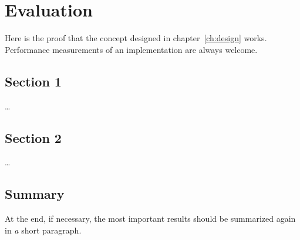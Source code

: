 
\chapter{Evaluation}
\label{ch:evaluation}
Here is the proof that the concept designed in chapter~\ref{ch:design}
works. 
Performance measurements of an implementation are always welcome.

\section{Section 1}
\label{ch:evaluation:sec:Section1}

\ldots

\section{Section 2}
\label{ch:evaluation:sec:Section2}

\ldots

\section{Summary}
\label{ch:evaluation:sec:summary}

At the end, if necessary, the most important results should be summarized again in \emph{a}
short paragraph.

